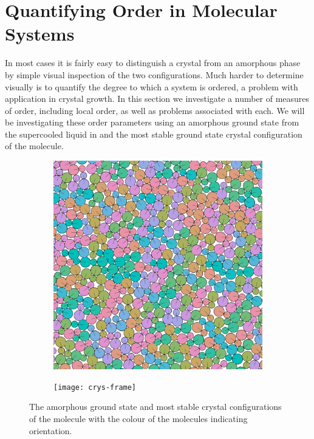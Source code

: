 \section{Quantifying Order in Molecular Systems}

In most cases it is fairly easy to distinguish a crystal from an amorphous phase by simple visual inspection of the two configurations. Much harder to determine visually is to quantify the degree to which a system is ordered, a problem with application in crystal growth. In this section we investigate a number of measures of order, including local order, as well as problems associated with each. We will be investigating these order parameters using an amorphous ground state from the supercooled \dcon liquid in  and the most stable ground state crystal configuration~ of the \dcon molecule.

\begin{figure}
    \begin{subfigure}{0.5\textwidth}
        \includegraphics[width=\linewidth]{amorphous-frame}
        \caption{}
        \label{fig:amorphous frame}
    \end{subfigure}
    \begin{subfigure}{0.5\textwidth}
        \texttt{[image: crys-frame]}
        \caption{}
        \label{fig:crys frame}
    \end{subfigure}
    \caption{The amorphous ground state and most stable crystal  configurations of the \dcon molecule with the colour of the molecules indicating orientation.}
    \label{fig:frame comp}
\end{figure}

